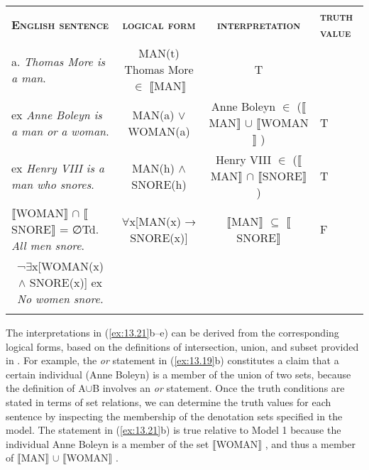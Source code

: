 \ea \label{ex:13.21}
\begin{tabularx}{\textwidth}{XXXXXX}
\lsptoprule

\bfseries\scshape English sentence & \multicolumn{2}{c}{\bfseries\scshape logical form} & \multicolumn{2}{c}{\bfseries\scshape interpretation} & \bfseries\scshape truth value\\

a. \textit{Thomas More is a man}. & \multicolumn{2}{c}{MAN(t)
\newline
Thomas More ${\in}$ \textsc{$\llbracket$}MAN$\rrbracket$ } & \multicolumn{2}{c}{ T} & \\

ex \textit{Anne Boleyn is} \textit{a man or} \textit{a woman}. & \multicolumn{2}{c}{MAN(a) $\vee$ WOMAN(a)} & \multicolumn{2}{c}{Anne Boleyn ${\in}$
\newline
(\textsc{$\llbracket$}MAN$\rrbracket$  ${\cup}$ \textsc{$\llbracket$}WOMAN$\rrbracket$ )} & T\\

ex \textit{Henry VIII is a man who snores}. & \multicolumn{2}{c}{MAN(h) $\wedge$ \textsc{SNORE}(h)} & \multicolumn{2}{c}{Henry VIII ${\in}$ (\textsc{$\llbracket$}MAN$\rrbracket$  ${\cap}$ \textsc{$\llbracket$SNORE}$\rrbracket$ )} & T\\

 \textsc{$\llbracket$WO}MAN$\rrbracket$  ${\cap}$ \textsc{$\llbracket$SNORE}$\rrbracket$  = ∅Td. \textit{All men snore}.& \multicolumn{2}{c}{${\forall}$x[MAN(x) → \textsc{SNORE}(x)]} & \multicolumn{2}{c}{\textsc{$\llbracket$}MAN$\rrbracket$  ${\subseteq}$ \textsc{$\llbracket$SNORE}$\rrbracket$ } & F\\
 
\multicolumn{1}{c}{¬${\exists}$x[WOMAN(x) $\wedge$ \textsc{SNORE}(x)]
\newline
ex \textit{No women snore.}} &  & \multicolumn{2}{c}{} & \multicolumn{2}{c}{}\\
\lspbottomrule
\end{tabularx}
\z
{}

The interpretations in (\ref{ex:13.21}b--e) can be derived from the corresponding logical forms, based on the definitions of intersection, union, and subset provided in . For example, the \textit{or} statement in (\ref{ex:13.19}b) constitutes a claim that a certain individual (Anne Boleyn) is a member of the union of two sets, because the definition of A${\cup}$B involves an \textit{or} statement. Once the truth conditions are stated in terms of set relations, we can determine the truth values for each sentence by inspecting the membership of the denotation sets specified in the model. The statement in (\ref{ex:13.21}b) is true relative to Model 1 because the individual Anne Boleyn is a member of the set $\llbracket$WOMAN$\rrbracket$ , and thus a member of $\llbracket$MAN$\rrbracket$  ${\cup}$ $\llbracket$WOMAN$\rrbracket$ .


